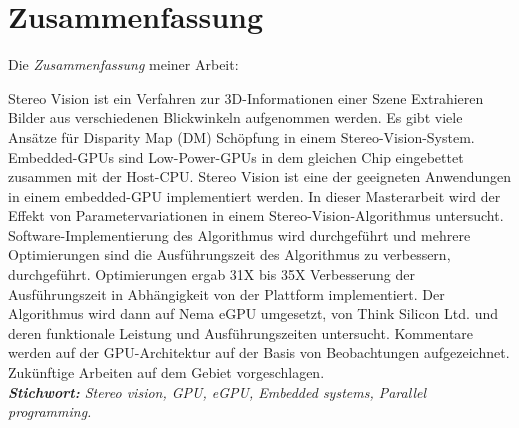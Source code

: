 \chapter*{Zusammenfassung}
\label{chap:abstract_de}

%
Die \textit{Zusammenfassung} meiner Arbeit:

Stereo Vision ist ein Verfahren zur 3D-Informationen einer Szene Extrahieren Bilder aus verschiedenen Blickwinkeln aufgenommen werden. Es gibt viele Ans\"atze f\"ur Disparity Map (DM) Sch\"opfung in einem Stereo-Vision-System. Embedded-GPUs sind Low-Power-GPUs in dem gleichen Chip eingebettet zusammen mit der Host-CPU. Stereo Vision ist eine der geeigneten Anwendungen in einem embedded-GPU implementiert werden. In dieser Masterarbeit wird der Effekt von Parametervariationen in einem Stereo-Vision-Algorithmus untersucht. Software-Implementierung des Algorithmus wird durchgef\"uhrt und mehrere Optimierungen sind die Ausf\"uhrungszeit des Algorithmus zu verbessern, durchgef\"uhrt. Optimierungen ergab 31X bis 35X Verbesserung der Ausf\"uhrungszeit in Abh\"angigkeit von der Plattform implementiert. Der Algorithmus wird dann auf Nema eGPU umgesetzt, von Think Silicon Ltd. und deren funktionale Leistung und Ausf\"uhrungszeiten untersucht. Kommentare werden auf der GPU-Architektur auf der Basis von Beobachtungen aufgezeichnet. Zuk\"unftige Arbeiten auf dem Gebiet vorgeschlagen.\\

\noindent
\textsl{\textbf{Stichwort:} Stereo vision, GPU, eGPU, Embedded systems, Parallel programming.}
